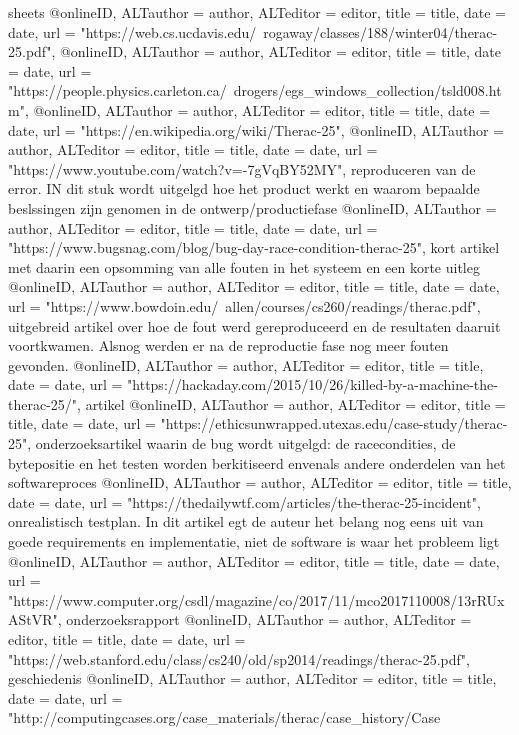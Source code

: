 {sheets
@online{ID,	ALTauthor = {author},	ALTeditor = {editor},	title = {title},	date = {date},	url = {"https://web.cs.ucdavis.edu/~rogaway/classes/188/winter04/therac-25.pdf"},}
@online{ID,	ALTauthor = {author},	ALTeditor = {editor},	title = {title},	date = {date},	url = {"https://people.physics.carleton.ca/~drogers/egs_windows_collection/tsld008.htm"},}
@online{ID,	ALTauthor = {author},	ALTeditor = {editor},	title = {title},	date = {date},	url = {"https://en.wikipedia.org/wiki/Therac-25"},}
@online{ID,	ALTauthor = {author},	ALTeditor = {editor},	title = {title},	date = {date},	url = {"https://www.youtube.com/watch?v=-7gVqBY52MY"},}
reproduceren van de error. IN dit stuk wordt uitgelgd hoe het product werkt en waarom bepaalde beslssingen zijn genomen in de ontwerp/productiefase
@online{ID,	ALTauthor = {author},	ALTeditor = {editor},	title = {title},	date = {date},	url = {"https://www.bugsnag.com/blog/bug-day-race-condition-therac-25"},}
kort artikel met daarin een opsomming van alle fouten in het systeem en een korte uitleg
@online{ID,	ALTauthor = {author},	ALTeditor = {editor},	title = {title},	date = {date},	url = {"https://www.bowdoin.edu/~allen/courses/cs260/readings/therac.pdf"},}
uitgebreid artikel over hoe de fout werd gereproduceerd en de resultaten daaruit voortkwamen. Alsnog werden er na de reproductie fase nog meer fouten gevonden.
@online{ID,	ALTauthor = {author},	ALTeditor = {editor},	title = {title},	date = {date},	url = {"https://hackaday.com/2015/10/26/killed-by-a-machine-the-therac-25/"},}
artikel
@online{ID,	ALTauthor = {author},	ALTeditor = {editor},	title = {title},	date = {date},	url = {"https://ethicsunwrapped.utexas.edu/case-study/therac-25"},}
onderzoeksartikel waarin de bug wordt uitgelgd: de racecondities, de bytepositie en het testen worden berkitiseerd envenals andere onderdelen van het softwareproces
@online{ID,	ALTauthor = {author},	ALTeditor = {editor},	title = {title},	date = {date},	url = {"https://thedailywtf.com/articles/the-therac-25-incident"},}
onrealistisch testplan. In dit artikel egt de auteur het belang nog eens uit van goede requirements en implementatie, niet de software is waar het probleem ligt
@online{ID,	ALTauthor = {author},	ALTeditor = {editor},	title = {title},	date = {date},	url = {"https://www.computer.org/csdl/magazine/co/2017/11/mco2017110008/13rRUxAStVR"},}
onderzoeksrapport
@online{ID,	ALTauthor = {author},	ALTeditor = {editor},	title = {title},	date = {date},	url = {"https://web.stanford.edu/class/cs240/old/sp2014/readings/therac-25.pdf"},}
geschiedenis
@online{ID,	ALTauthor = {author},	ALTeditor = {editor},	title = {title},	date = {date},	url = {"http://computingcases.org/case_materials/therac/case_history/Case%
}}}
